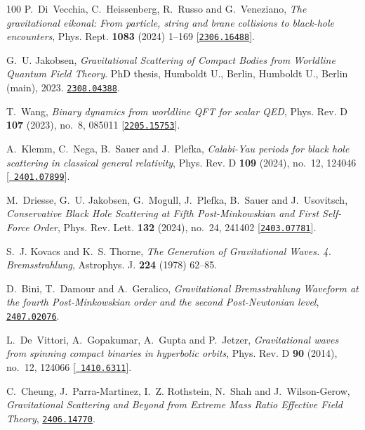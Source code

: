 \begin{thebibliography}{100}
P.~Di~Vecchia, C.~Heissenberg, R.~Russo and G.~Veneziano,  {\em {The
  gravitational eikonal: From particle, string and brane collisions to
  black-hole encounters}}, Phys. Rept. {\bf 1083} (2024) 1--169
  [\href{http://www.arXiv.org/abs/2306.16488}{{\tt 2306.16488}}].

G.~U. Jakobsen, {\em {Gravitational Scattering of Compact Bodies from Worldline
  Quantum Field Theory}}.
\newblock PhD thesis, Humboldt U., Berlin, Humboldt U., Berlin (main), 2023.
\newblock \href{http://www.arXiv.org/abs/2308.04388}{{\tt 2308.04388}}.

T.~Wang,  {\em {Binary dynamics from worldline QFT for scalar QED}}, Phys. Rev.
  D {\bf 107} (2023), no.~8, 085011
  [\href{http://www.arXiv.org/abs/2205.15753}{{\tt 2205.15753}}].

A.~Klemm, C.~Nega, B.~Sauer and J.~Plefka,  {\em {Calabi-Yau periods for black
  hole scattering in classical general relativity}}, Phys. Rev. D {\bf 109}
  (2024), no.~12, 124046 [\href{http://www.arXiv.org/abs/2401.07899}{{\tt
  2401.07899}}].

M.~Driesse, G.~U. Jakobsen, G.~Mogull, J.~Plefka, B.~Sauer and J.~Usovitsch,
  {\em {Conservative Black Hole Scattering at Fifth Post-Minkowskian and First
  Self-Force Order}}, Phys. Rev. Lett. {\bf 132} (2024), no.~24, 241402
  [\href{http://www.arXiv.org/abs/2403.07781}{{\tt 2403.07781}}].

S.~J. Kovacs and K.~S. Thorne,  {\em {The Generation of Gravitational Waves. 4.
  Bremsstrahlung}}, Astrophys. J. {\bf 224} (1978) 62--85.

D.~Bini, T.~Damour and A.~Geralico,  {\em {Gravitational Bremsstrahlung
  Waveform at the fourth Post-Minkowskian order and the second Post-Newtonian
  level}}, \href{http://www.arXiv.org/abs/2407.02076}{{\tt 2407.02076}}.

L.~De~Vittori, A.~Gopakumar, A.~Gupta and P.~Jetzer,  {\em {Gravitational waves
  from spinning compact binaries in hyperbolic orbits}}, Phys. Rev. D {\bf 90}
  (2014), no.~12, 124066 [\href{http://www.arXiv.org/abs/1410.6311}{{\tt
  1410.6311}}].

C.~Cheung, J.~Parra-Martinez, I.~Z. Rothstein, N.~Shah and J.~Wilson-Gerow,
  {\em {Gravitational Scattering and Beyond from Extreme Mass Ratio Effective
  Field Theory}}, \href{http://www.arXiv.org/abs/2406.14770}{{\tt 2406.14770}}.


\end{thebibliography}
